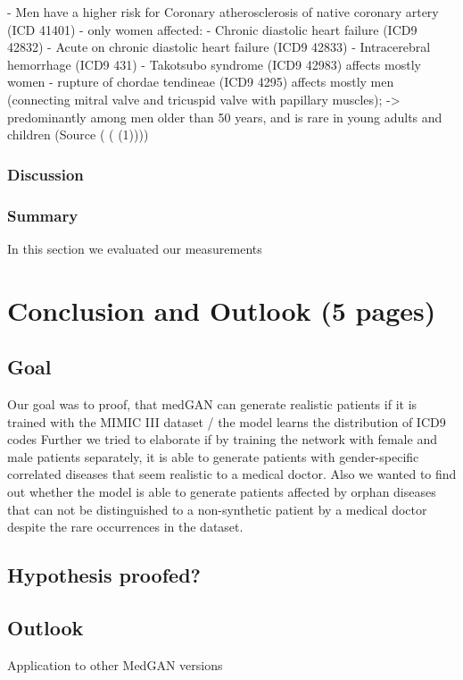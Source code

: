 \documentclass[11pt, a4paper]{book}
\begin{document}
- Men have a higher risk for  Coronary atherosclerosis of native coronary artery (ICD 41401)
- only women affected:
  - Chronic diastolic heart failure (ICD9 42832)
  - Acute on chronic diastolic heart failure  (ICD9 42833)
  - Intracerebral hemorrhage (ICD9 431)
- Takotsubo syndrome (ICD9 42983) affects mostly women
- rupture of chordae tendineae (ICD9 4295) affects mostly men (connecting mitral valve and tricuspid valve with papillary muscles); 
  -> predominantly among men older than 50 years, and is rare in young adults and children (Source ( ( (1))))


\subsection{Discussion}

\subsection{Summary}
In this section we evaluated our measurements

\chapter{Conclusion and Outlook (5 pages)}
\section{Goal}
Our goal was to proof, that medGAN can generate realistic patients if it is trained with the MIMIC III dataset / the model learns the distribution of ICD9 codes 
Further we tried to elaborate if by training the network with female and male patients separately, it is able to generate patients with gender-specific correlated diseases that seem realistic to a medical doctor.
Also we wanted to find out whether the model is able to generate patients affected by orphan diseases that can not be distinguished to a non-synthetic patient by a medical doctor despite the rare occurrences in the dataset.

\section{Hypothesis proofed?}
\section{Outlook}
Application to other MedGAN versions
\end{document}
